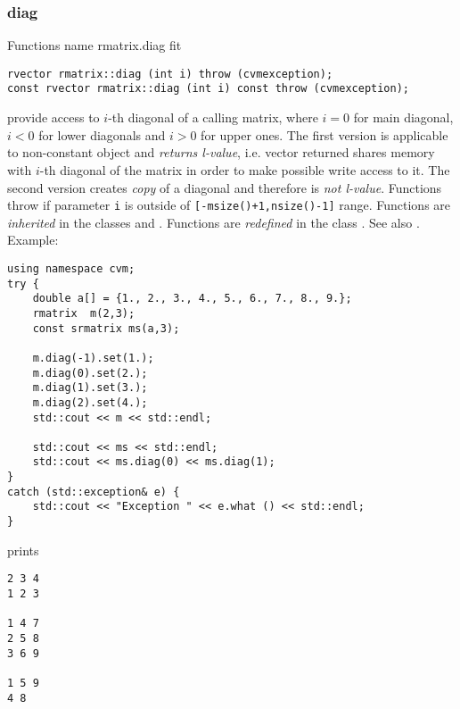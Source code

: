 \subsubsection{diag}
Functions%
\pdfdest name {rmatrix.diag} fit
\begin{verbatim}
rvector rmatrix::diag (int i) throw (cvmexception);
const rvector rmatrix::diag (int i) const throw (cvmexception);
\end{verbatim}
provide access to  \hbox{$i$-th} diagonal of a calling matrix,
where $i=0$ for main diagonal, $i<0$ for lower diagonals
and $i>0$ for upper ones.
The first version
is applicable to  non-constant object and
\emph{returns  l-value}, i.e. vector returned shares  memory
with  \hbox{$i$-th} diagonal of the matrix
in order to make possible write access to it.
The second version creates  \emph{copy} of a diagonal and therefore is
\emph{not  l-value}.
Functions throw 
if  parameter \verb"i" is outside of
\verb"[-msize()+1,nsize()-1]" range.
Functions are \emph{inherited}
in  the classes
 and .
Functions are \emph{redefined}
in  the class .
See also .
Example:
\begin{Verbatim}
using namespace cvm;
try {
    double a[] = {1., 2., 3., 4., 5., 6., 7., 8., 9.};
    rmatrix  m(2,3);
    const srmatrix ms(a,3);

    m.diag(-1).set(1.);
    m.diag(0).set(2.);
    m.diag(1).set(3.);
    m.diag(2).set(4.);
    std::cout << m << std::endl;

    std::cout << ms << std::endl;
    std::cout << ms.diag(0) << ms.diag(1);
}
catch (std::exception& e) {
    std::cout << "Exception " << e.what () << std::endl;
}
\end{Verbatim}
prints
\begin{Verbatim}
2 3 4
1 2 3

1 4 7
2 5 8
3 6 9

1 5 9
4 8
\end{Verbatim}
\newpage




